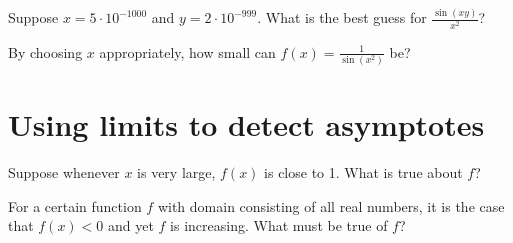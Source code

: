 \documentclass{ximera}
\begin{document}
\begin{problem}

  Suppose $x = 5 \cdot 10^{-1000}$ and $y = 2 \cdot 10^{-999}$.  What is the best guess for $\frac{\sin (xy)}{x^2}$?
  \begin{multipleChoice}
  \end{multipleChoice}
\end{problem}

\begin{problem}
  By choosing $x$ appropriately, how small can $f(x) = \frac{1}{\sin (x^2)}$ be?
  \begin{multipleChoice}
  \end{multipleChoice}
\end{problem}

\clearpage

\section{Using limits to detect asymptotes}

\begin{problem}
  Suppose whenever $x$ is very large, $f(x)$ is close to 1.  What is true about $f$?
  \begin{multipleChoice}
  \end{multipleChoice}
\end{problem}

\begin{problem}
  For a certain function $f$ with domain consisting of all real
  numbers, it is the case that $f(x) < 0$ and yet $f$ is increasing.
  What must be true of $f$?
  \begin{multipleChoice}
  \end{multipleChoice}
\end{problem}
\end{document}
